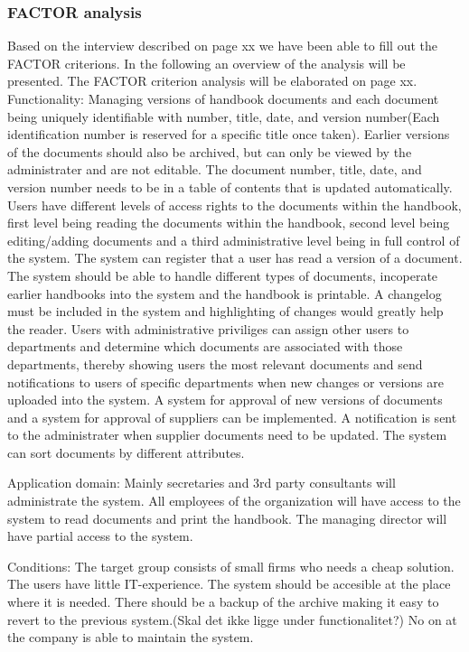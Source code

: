 \subsubsection{FACTOR analysis}

Based on the interview described on page xx we have been able to fill out the FACTOR criterions. In the following an overview of the analysis will be presented. The FACTOR criterion analysis will be elaborated on page xx.
Functionality: Managing versions of handbook documents and each document being uniquely identifiable with number, title, date, and version number(Each identification number is reserved for a specific title once taken). Earlier versions of the documents should also be archived, but can only be viewed by the administrater and are not editable.
The document number, title, date, and version number needs to be in a table of contents that is updated automatically.
Users have different levels of access rights to the documents within the handbook, first level being reading the documents within the handbook, second level being editing/adding documents and a third administrative level being in full control of the system.
The system can register that a user has read a version of a document.
The system should be able to handle different types of documents, incoperate earlier handbooks into the system and the handbook is printable.
A changelog must be included in the system and highlighting of changes would greatly help the reader.
Users with administrative priviliges can assign other users to departments and determine which documents are associated with those departments, thereby showing users the most relevant documents and send notifications to users of specific departments when new changes or versions are uploaded into the system.
A system for approval of new versions of documents and a system for approval of suppliers can be implemented.
A notification is sent to the administrater when supplier documents need to be updated. The system can sort documents by different attributes.

Application domain: Mainly secretaries and 3rd party consultants will administrate the system. All employees of the organization will have access to the system to read documents and print the handbook. The managing director will have partial access to the system.

Conditions: The target group consists of small firms who needs a cheap
solution. The users have little IT-experience. The system should be accesible at the place where it is needed.
There should be a backup of the archive making it easy to revert to the previous system.(Skal det ikke ligge under functionalitet?)
No on at the company is able to maintain the system.

